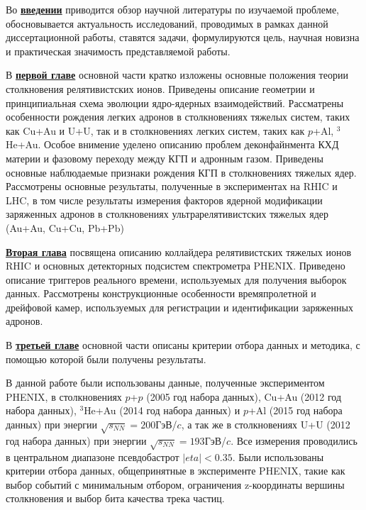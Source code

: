 Во \underline{\textbf{введении}} приводится обзор научной литературы по изучаемой проблеме, обосновывается актуальность исследований, проводимых в рамках данной диссертационной работы, ставятся задачи, формулируются цель, научная новизна и практическая значимость представляемой работы.

В \underline{\textbf{первой главе}} основной части кратко изложены основные положения теории столкновения релятивистских ионов.  Приведены описание геометрии и принципиальная схема эволюции ядро-ядерных взаимодействий. Рассматрены особенности рождения легких адронов в столкновениях тяжелых систем, таких как Cu+Au и U+U, так и в столкновениях легких систем, таких как $p$+Al, $^{3}$He+Au. Особое внимение уделено описанию проблем деконфайнмента КХД материи и фазовому переходу между КГП и адронным газом. Приведены основные наблюдаемые признаки рождения КГП в столкновениях тяжелых ядер. Рассмотрены основные результаты, полученные в экспериментах на RHIC и LHC, в том числе результаты измерения факторов ядерной модификации заряженных адронов в столкновениях ультрарелятивистских тяжелых ядер (Au+Au, Cu+Cu, Pb+Pb)

\underline{\textbf{Вторая глава}} посвящена описанию коллайдера релятивистских тяжелых ионов RHIC и основных детекторных подсистем спектрометра PHENIX. Приведено описание триггеров реального времени, используемых для получения выборок данных. Рассмотрены конструкционные особенности времяпролетной и дрейфовой камер, используемых для регистрации и идентификации заряженных адронов.

В \underline{\textbf{третьей главе}} основной части описаны критерии отбора данных и методика, с помощью которой были получены результаты.

В данной работе были использованы данные, полученные экспериментом PHENIX, в столкновениях $p$+$p$ (2005 год набора данных), Cu+Au (2012 год набора данных), $^{3}$He+Au (2014 год набора данных) и $p$+Al (2015 год набора данных) при энергии $\sqrt{s_{NN}}=200$ГэВ/$c$, а так же в столкновениях U+U (2012 год набора данных) при энергии $\sqrt{s_{NN}}=193$ГэВ/$c$. Все измерения проводились в центральном диапазоне псевдобастрот $|eta|<0.35$.
Были использованы критерии отбора данных, общепринятные в эксперименте PHENIX, такие как выбор событий с минимальным отбором, ограничения z-координаты вершины столкновения и выбор бита качества трека частиц. 

